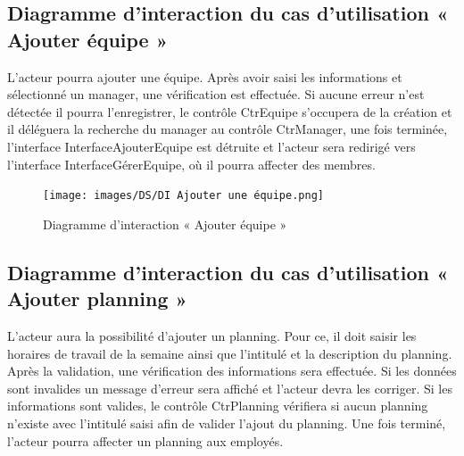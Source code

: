 \subsection*{Diagramme d'interaction du cas d'utilisation « Ajouter équipe »}
L’acteur pourra ajouter une équipe. Après avoir saisi les informations et
sélectionné un manager, une vérification est effectuée. Si aucune erreur n’est
détectée il pourra l’enregistrer, le contrôle CtrEquipe s’occupera de la
création et il déléguera la recherche du manager au contrôle CtrManager, une
fois terminée, l’interface InterfaceAjouterEquipe est détruite et l’acteur sera
redirigé vers l’interface InterfaceGérerEquipe, où il pourra affecter des
membres.

\clearpage

\begin{figure}[h!]
    \centering
    \texttt{[image: images/DS/DI Ajouter une équipe.png]}
    \caption{Diagramme d'interaction « Ajouter équipe »}
    \label{fig38}
\end{figure}

\subsection*{Diagramme d'interaction du cas d'utilisation « Ajouter planning »}
L’acteur aura la possibilité d’ajouter un planning. Pour ce, il doit saisir les
horaires de travail de la semaine ainsi que l’intitulé et la description du
planning.  Après la validation, une vérification des informations sera
effectuée. Si les données sont invalides un message d’erreur sera affiché et
l’acteur devra les corriger. Si les informations sont valides, le contrôle
CtrPlanning vérifiera si aucun planning n’existe avec l’intitulé saisi afin de
valider l’ajout du planning. Une fois terminé, l’acteur pourra affecter un
planning aux employés.

\clearpage

